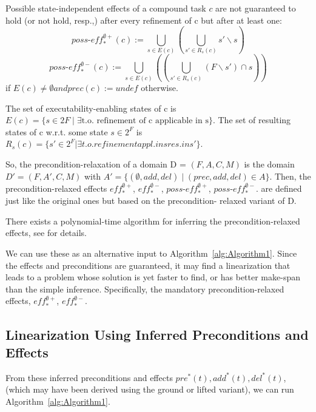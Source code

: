 \documentclass[letterpaper]{article} %
\newcommand{\PreS} {\ensuremath{\mathit{pre^{*}}}}
\newcommand{\AddS} {\ensuremath{\mathit{add^{*}}}}
\newcommand{\DelS} {\ensuremath{\mathit{del^{*}}}}
\newcommand{\RelEffPlus} {\ensuremath{\mathit{eff^{\emptyset +}_{*}}}}
\newcommand{\RelEffMinus} {\ensuremath{\mathit{eff^{\emptyset -}_{*}}}}
\newcommand{\RelPossEffPlus} {\ensuremath{\mathit{\textit{poss-eff}^{\emptyset +}_{*}}}}
\newcommand{\RelPossEffMinus} {\ensuremath{\mathit{\textit{poss-eff}^{\emptyset -}_{*}}}}
\begin{document}
Possible state-independent effects of a compound task $c$ are not guaranteed to hold (or not hold, resp.,)
after every refinement of c but after at least one:
$$ \RelPossEffPlus(c) := \bigcup_{s \in E(c)}  ( \bigcup_{s' \in R_s(c)}  s' \backslash s) $$
$$ \RelPossEffMinus(c) := \bigcup_{s \in E(c)} ((\bigcup_{s' \in R_s(c)} (F \backslash s') \cap s ))$$
if $E(c) \neq \emptyset and prec(c) := undef$ otherwise.


The set of executability-enabling states of c is
$E(c) = \{s \in 2F  \mid  \exists \text{t.o. refinement of c applicable in s} \}$.
The set of resulting states of c w.r.t. some state $s \in 2^F$ is
$R_s(c) = \{s' \in 2^F | \exists t.o. refinement appl. in s res. in s' \}$.

So, the precondition-relaxation of a domain D = $(F, A, C, M)$ is the domain $D' = (F, A', C, M)$
with $A' = \{(\emptyset, add , del ) \mid (prec, add , del ) \in A\}$.
Then, the precondition-relaxed effects $\RelEffPlus$, $\RelEffMinus$, $\RelPossEffPlus$, $\RelPossEffMinus$. are defined just like the original ones but based on the precondition-
relaxed variant of D.

There exists a polynomial-time algorithm for inferring the precondition-relaxed effects, see \cite{ConnyPreEstimation} for details.

We can use these as an alternative input to Algorithm~\ref{alg:Algorithm1}. Since the effects and preconditions are guaranteed, it may find a linearization that leads to a problem whose solution is yet faster to find,
or has better make-span than the simple inference. Specifically, the mandatory precondition-relaxed effects, $\RelEffPlus$, $\RelEffMinus$.

\subsection{Linearization Using Inferred Preconditions and Effects}

From these inferred preconditions and effects $\PreS(t), \AddS(t), \DelS(t)$, (which may have been derived using the ground or lifted variant), we can run Algorithm~\ref{alg:Algorithm1}.
\end{document}
